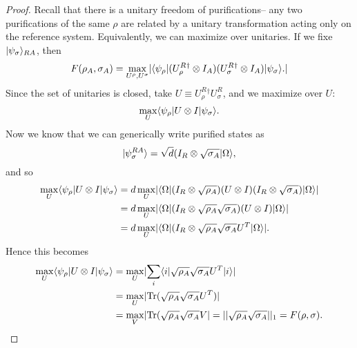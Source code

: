 \begin{thm}[Uhlmann]
\begin{proof}
        Recall that there is a unitary freedom of purifications-- any two purifications of the same $\rho$ are related by a unitary transformation acting only on the reference system. Equivalently, we can maximize over unitaries. If we fixe $\lvert\psi_\sigma\rangle_{RA}$, then
        \begin{equation}
            F(\rho_A,\sigma_A)=\max_{U^\rho, U^\sigma} \lvert\langle\psi_\rho\rvert (U_\rho^R{}^\dagger \otimes I_A) (U_\sigma^R{}^\dagger \otimes I_A)\lvert\psi_\sigma\rangle.
            \rvert
        \end{equation}
        Since the set of unitaries is closed, take $U\equiv U_\rho^R{}^\dagger U_\sigma^R$, and we maximize over $U$:
        \begin{equation*}
            \max_U \langle\psi_\rho\rvert U\otimes I \lvert\psi_\sigma\rangle.
        \end{equation*}
        Now we know that we can generically write purified states as
        \begin{equation}
            \lvert\psi_\sigma^{RA}\rangle=\sqrt{d}(I_R \otimes \sqrt{\sigma_A} \lvert\Omega\rangle,
        \end{equation}
        and so
        \begin{align*}
            \max_U \langle\psi_\rho\rvert U\otimes I \lvert\psi_\sigma\rangle &= d\max_U \lvert\langle\Omega\rvert(I_R \otimes \sqrt{\rho_A})(U\otimes I)(I_R \otimes \sqrt{\sigma_A})\lvert\Omega\rangle
            \rvert\\
                &= d\max_U \lvert\langle\Omega\rvert(I_R \otimes \sqrt{\rho_A}\sqrt{\sigma_A})(U\otimes I)\lvert\Omega\rangle\rvert\\
                &=d\max_U \lvert\langle\Omega\rvert(I_R \otimes \sqrt{\rho_A}\sqrt{\sigma_A}U^T\lvert\Omega\rangle\rvert.
        \end{align*}
        Hence this becomes
        \begin{align*}
            \max_U \langle\psi_\rho\rvert U\otimes I \lvert\psi_\sigma\rangle&=\max_U \lvert\sum_i \langle i\rvert \sqrt{\rho_A}\sqrt{\sigma_A} U^T \lvert i\rangle\rvert\\
            &= \max_U \lvert\operatorname{Tr}(\sqrt{\rho_A}\sqrt{\sigma_A} U^T)\rvert\\
            &=\max_V \lvert\operatorname{Tr} (\sqrt{\rho_A}\sqrt{\sigma_A} V\rvert = ||\sqrt{\rho_A}\sqrt{\sigma_A}||_1 =F(\rho,\sigma).
        \end{align*}
    \end{proof}
\end{thm}